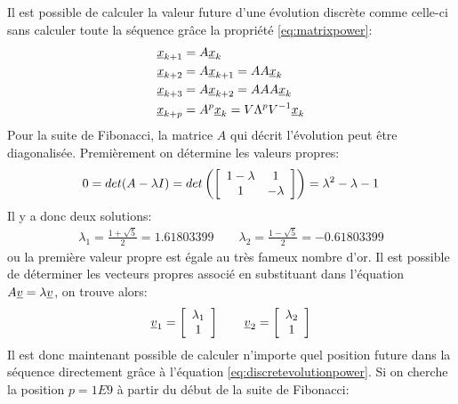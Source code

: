 Il est possible de calculer la valeur future d'une évolution discrète comme celle-ci sans calculer toute la séquence grâce la propriété \eqref{eq:matrixpower}:
\begin{align}
\underline{x}_{k+1} &= A \underline{x}_{k} \\
\underline{x}_{k+2} &= A \underline{x}_{k+1} = A A \underline{x}_{k} \\
\underline{x}_{k+3} &= A \underline{x}_{k+2} = A A A \underline{x}_{k} \\
\underline{x}_{k+p} &= A^p \underline{x}_{k} = V \Lambda^p V^{-1} \underline{x}_{k}
\label{eq:discretevolutionpower}
\end{align}
Pour la suite de Fibonacci, la matrice $A$ qui décrit l'évolution peut être diagonalisée. Premièrement on détermine les valeurs propres:
\begin{align}
0
=
det(A - \lambda I) 
=
det\left(
\left[ \begin{array}{c c}  
1-\lambda & 1 \\ 1 & -\lambda  
\end{array} \right]
\right)
= 
\lambda^2 - \lambda -1 
\end{align}
Il y a donc deux solutions:
\begin{align}
\lambda_1 = \frac{1 + \sqrt{5}}{2} = 1.61803399 \quad\quad \lambda_2 = \frac{1 - \sqrt{5}}{2} = -0.61803399
\end{align}
ou la première valeur propre est égale au très fameux nombre d'or. Il est possible de déterminer les vecteurs propres associé en substituant dans l'équation $A \underline{v} = \lambda \underline{v}$, on trouve alors:
\begin{align}
\underline{v}_1 = 
\left[ \begin{array}{c}  
\lambda_1 \\ 1
\end{array} \right]
\quad\quad 
\underline{v}_2 = 
\left[ \begin{array}{c}  
\lambda_2 \\ 1 
\end{array} \right]
\end{align}
Il est donc maintenant possible de calculer n'importe quel position future dans la séquence directement grâce à l'équation \eqref{eq:discretevolutionpower}. Si on cherche la position $p=1E9$ à partir du début de la suite de Fibonacci:
